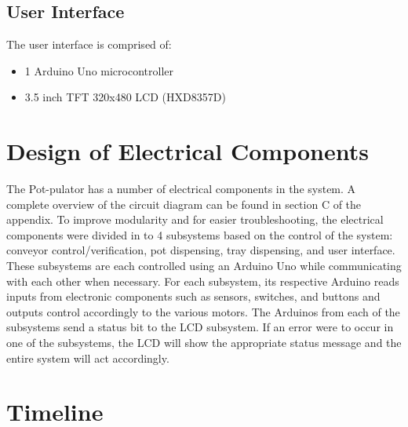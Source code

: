 \documentclass[12pt, titlepage]{article}
\begin{document}
\subsection{User Interface}

The user interface is comprised of:
\begin{itemize}
  \item 1 Arduino Uno microcontroller
  \item 3.5 inch TFT 320x480 LCD (HXD8357D)
\end{itemize}

\section{Design of Electrical Components}

The Pot-pulator has a number of electrical components in the system. A complete overview of the circuit diagram
can be found in section C of the appendix. To improve modularity and for easier troubleshooting,
the electrical components were divided in to 4 subsystems based on the control of the system: conveyor control/verification, pot
dispensing, tray dispensing, and user interface. These subsystems are each controlled using an 
Arduino Uno while communicating with each other when necessary. For each subsystem,
its respective Arduino reads inputs from electronic components such as sensors, switches, and buttons and 
outputs control accordingly to the various motors. The Arduinos from each of the 
subsystems send a status bit to the LCD subsystem. If an error were to occur in
one of the subsystems, the LCD will show the appropriate status message and the entire system will act accordingly.





\section{Timeline}
\end{document}
